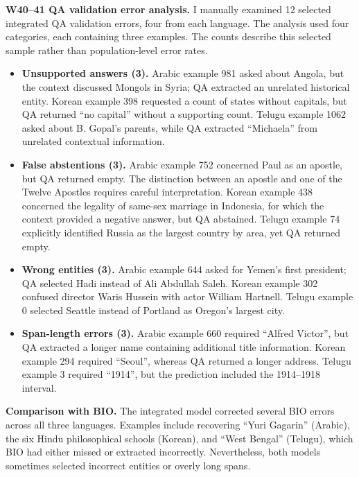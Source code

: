 \documentclass[11pt,a4paper,twocolumn]{article}
\begin{document}
\textbf{W40--41 QA validation error analysis.}
I manually examined 12 selected integrated QA
validation errors, four from each language.
The analysis used four categories, each containing
three examples. The counts describe this selected
sample rather than population-level error rates.

\begin{itemize}

\item \textbf{Unsupported answers (3).}
Arabic example 981 asked about Angola, but the
context discussed Mongols in Syria; QA extracted
an unrelated historical entity. Korean example
398 requested a count of states without capitals,
but QA returned ``no capital'' without a
supporting count. Telugu example 1062 asked
about B. Gopal's parents, while QA extracted
``Michaela'' from unrelated contextual information.

\item \textbf{False abstentions (3).}
Arabic example 752 concerned Paul as an apostle,
but QA returned empty. The distinction between
an apostle and one of the Twelve Apostles
requires careful interpretation.
Korean example 438 concerned the legality of
same-sex marriage in Indonesia, for which the
context provided a negative answer, but QA
abstained. Telugu example 74 explicitly identified
Russia as the largest country by area, yet QA
returned empty.

\item \textbf{Wrong entities (3).}
Arabic example 644 asked for Yemen's first
president; QA selected Hadi instead of
Ali Abdullah Saleh. Korean example 302 confused
director Waris Hussein with actor William
Hartnell. Telugu example 0 selected Seattle
instead of Portland as Oregon's largest city.

\item \textbf{Span-length errors (3).}
Arabic example 660 required ``Alfred Victor'',
but QA extracted a longer name containing
additional title information. Korean example
294 required ``Seoul'', whereas QA returned
a longer address. Telugu example 3 required
``1914'', but the prediction included the
1914--1918 interval.

\end{itemize}

\textbf{Comparison with BIO.}
The integrated model corrected several BIO
errors across all three languages. Examples
include recovering ``Yuri Gagarin'' (Arabic),
the six Hindu philosophical schools (Korean),
and ``West Bengal'' (Telugu), which BIO had
either missed or extracted incorrectly.
Nevertheless, both models sometimes selected
incorrect entities or overly long spans.
\end{document}
